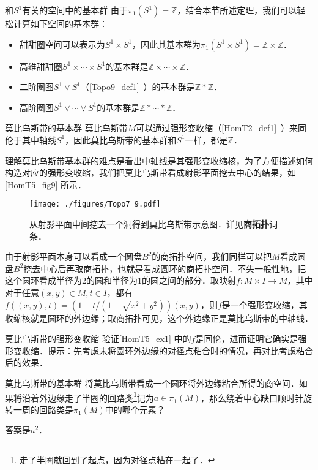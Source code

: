 \begin{example}{和$S^1$有关的空间中的基本群}
由于$\pi_1(S^1)=\mathbb{Z}$，结合本节所述定理，我们可以轻松计算如下空间的基本群：
\begin{itemize}
\item 甜甜圈空间可以表示为$S^1\times S^1$，因此其基本群为$\pi_1(S^1\times S^1)=\mathbb{Z}\times\mathbb{Z}$．
\item 高维甜甜圈$S^1\times\cdots\times S^1$的基本群是$\mathbb{Z}\times\cdots\times\mathbb{Z}$．
\item 二阶圈图$S^1\vee S^1$（\autoref{Topo9_def1}~）的基本群是$\mathbb{Z}*\mathbb{Z}$．
\item 高阶圈图$S^1\vee\cdots\vee S^1$的基本群是$\mathbb{Z}*\cdots*\mathbb{Z}$．
\end{itemize}

\end{example}

\begin{example}{莫比乌斯带的基本群}\label{HomT5_ex1}
莫比乌斯带$M$可以通过强形变收缩（\autoref{HomT2_def1}~）来同伦于其中轴线$S^1$，因此莫比乌斯带的基本群和$S^1$一样，都是$\mathbb{Z}$．

理解莫比乌斯带基本群的难点是看出中轴线是其强形变收缩核，为了方便描述如何构造对应的强形变收缩，我们把莫比乌斯带看成射影平面挖去中心的结果，如\autoref{HomT5_fig9} 所示．

\begin{figure}[ht]
\centering
\texttt{[image: ./figures/Topo7\_9.pdf]}
\caption{从射影平面中间挖去一个洞得到莫比乌斯带示意图．详见\textbf{商拓扑}词条．} \label{HomT5_fig9}
\end{figure}

由于射影平面本身可以看成一个圆盘$B^2$的商拓扑空间，我们同样可以把$M$看成圆盘$B^2$挖去中心后再取商拓扑，也就是看成圆环的商拓扑空间．不失一般性地，把这个圆环看成半径为$2$的圆和半径为$1$的圆之间的部分．取映射$f:M\times I\rightarrow M$，其中对于任意$(x, y)\in M, t\in I$，都有$f((x, y), t)= (1+t/(1-\sqrt{x^2+y^2}))(x, y)$，则$f$是一个强形变收缩，其收缩核就是圆环的外边缘；取商拓扑可见，这个外边缘正是莫比乌斯带的中轴线．
\end{example}

\begin{exercise}{莫比乌斯带的强形变收缩}
验证\autoref{HomT5_ex1} 中的$f$是同伦，进而证明它确实是强形变收缩．提示：先考虑未将圆环外边缘的对径点粘合时的情况，再对比考虑粘合后的效果．
\end{exercise}

\begin{exercise}{莫比乌斯带的基本群}
将莫比乌斯带看成一个圆环将外边缘粘合所得的商空间．如果将沿着外边缘走了半圈的回路类\footnote{走了半圈就回到了起点，因为对径点粘在一起了．}记为$a\in\pi_1(M)$，那么绕着中心缺口顺时针旋转一周的回路类是$\pi_1(M)$中的哪个元素？

答案是$a^2$．
\end{exercise}



